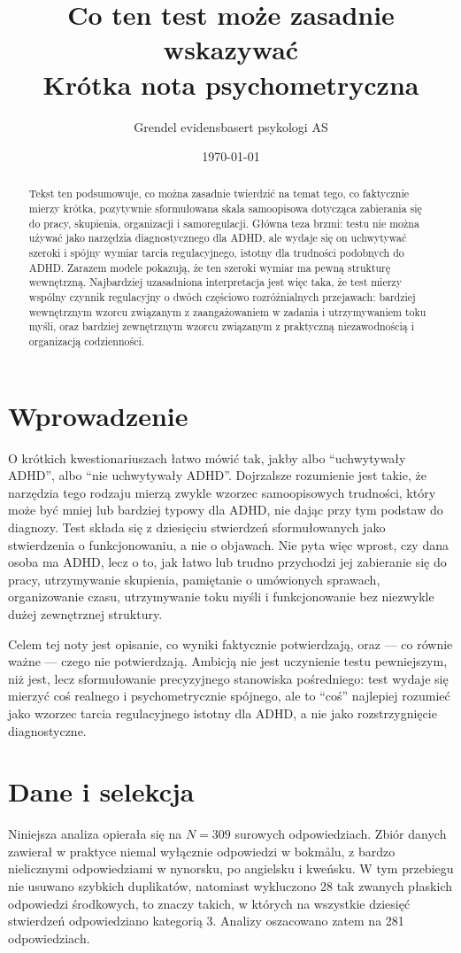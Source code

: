 \documentclass[11pt,a4paper]{article}
\title{Co ten test może zasadnie wskazywać\\
\large Krótka nota psychometryczna}
\author{Grendel evidensbasert psykologi AS}
\date{\today}
\begin{document}
\maketitle

\begin{abstract}
Tekst ten podsumowuje, co można zasadnie twierdzić na temat tego, co faktycznie mierzy krótka, pozytywnie sformułowana skala samoopisowa dotycząca zabierania się do pracy, skupienia, organizacji i samoregulacji. Główna teza brzmi: testu nie można używać jako narzędzia diagnostycznego dla ADHD, ale wydaje się on uchwytywać szeroki i spójny wymiar tarcia regulacyjnego, istotny dla trudności podobnych do ADHD. Zarazem modele pokazują, że ten szeroki wymiar ma pewną strukturę wewnętrzną. Najbardziej uzasadniona interpretacja jest więc taka, że test mierzy wspólny czynnik regulacyjny o dwóch częściowo rozróżnialnych przejawach: bardziej wewnętrznym wzorcu związanym z zaangażowaniem w zadania i utrzymywaniem toku myśli, oraz bardziej zewnętrznym wzorcu związanym z praktyczną niezawodnością i organizacją codzienności.
\end{abstract}

\section{Wprowadzenie}
O krótkich kwestionariuszach łatwo mówić tak, jakby albo ``uchwytywały ADHD'', albo ``nie uchwytywały ADHD''. Dojrzalsze rozumienie jest takie, że narzędzia tego rodzaju mierzą zwykle wzorzec samoopisowych trudności, który może być mniej lub bardziej typowy dla ADHD, nie dając przy tym podstaw do diagnozy. Test składa się z dziesięciu stwierdzeń sformułowanych jako stwierdzenia o funkcjonowaniu, a nie o objawach. Nie pyta więc wprost, czy dana osoba ma ADHD, lecz o to, jak łatwo lub trudno przychodzi jej zabieranie się do pracy, utrzymywanie skupienia, pamiętanie o umówionych sprawach, organizowanie czasu, utrzymywanie toku myśli i funkcjonowanie bez niezwykle dużej zewnętrznej struktury.

Celem tej noty jest opisanie, co wyniki faktycznie potwierdzają, oraz — co równie ważne — czego nie potwierdzają. Ambicją nie jest uczynienie testu pewniejszym, niż jest, lecz sformułowanie precyzyjnego stanowiska pośredniego: test wydaje się mierzyć coś realnego i psychometrycznie spójnego, ale to ``coś'' najlepiej rozumieć jako wzorzec tarcia regulacyjnego istotny dla ADHD, a nie jako rozstrzygnięcie diagnostyczne.

\section{Dane i selekcja}
Niniejsza analiza opierała się na $N = 309$ surowych odpowiedziach. Zbiór danych zawierał w praktyce niemal wyłącznie odpowiedzi w bokmålu, z bardzo nielicznymi odpowiedziami w nynorsku, po angielsku i kweńsku. W tym przebiegu nie usuwano szybkich duplikatów, natomiast wykluczono 28 tak zwanych płaskich odpowiedzi środkowych, to znaczy takich, w których na wszystkie dziesięć stwierdzeń odpowiedziano kategorią 3. Analizy oszacowano zatem na 281 odpowiedziach.
\end{document}
